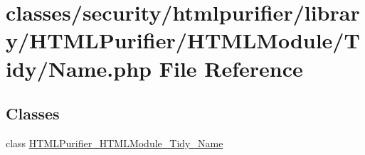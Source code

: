 \hypertarget{HTMLModule_2Tidy_2Name_8php}{\section{classes/security/htmlpurifier/library/\+H\+T\+M\+L\+Purifier/\+H\+T\+M\+L\+Module/\+Tidy/\+Name.php File Reference}
\label{HTMLModule_2Tidy_2Name_8php}
}
\subsection*{Classes}
\begin{DoxyCompactItemize}
\item 
class \hyperlink{classHTMLPurifier__HTMLModule__Tidy__Name}{H\+T\+M\+L\+Purifier\+\_\+\+H\+T\+M\+L\+Module\+\_\+\+Tidy\+\_\+\+Name}
\end{DoxyCompactItemize}

